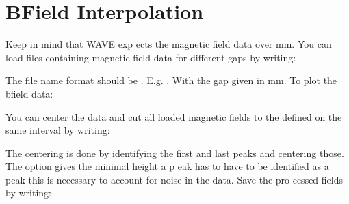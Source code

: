 \documentclass[letterpaper,10pt,english]{sphinxmanual}
\begin{document}
\section{B\sphinxhyphen{}Field Interpolation}
\label{\detokenize{tutorial:b-field-interpolation}}
\sphinxAtStartPar
Keep in mind that WAVE exp ects the magnetic field data over mm.
You can load files containing magnetic field data for different gaps by
writing:

\begin{sphinxVerbatim}[commandchars=\\\{\}]
  
\end{sphinxVerbatim}

\sphinxAtStartPar
The file name format should be .
E.g. . With the gap given in mm.
To plot the b\sphinxhyphen{}field data:

\begin{sphinxVerbatim}[commandchars=\\\{\}]
    
\end{sphinxVerbatim}

\sphinxAtStartPar
You can center the data and cut all loaded magnetic fields to
the defined on the same interval by writing:

\begin{sphinxVerbatim}[commandchars=\\\{\}]
       
     
\end{sphinxVerbatim}

\sphinxAtStartPar
The centering is done by identifying the first and last
peaks and centering those. The option 
gives the minimal height a p eak has to have to be identified as a
peak \sphinxhyphen{} this is necessary to account for noise in the data.
Save the pro cessed fields by writing:
\end{document}
